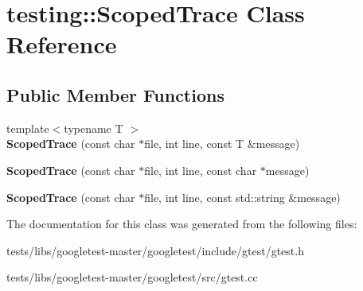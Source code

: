 \hypertarget{classtesting_1_1ScopedTrace}{}\section{testing\+:\+:Scoped\+Trace Class Reference}
\label{classtesting_1_1ScopedTrace}
\subsection*{Public Member Functions}
\begin{DoxyCompactItemize}
\item 
\mbox{\label{classtesting_1_1ScopedTrace_a2da90b95d682d518cca472934d53c59c}} 
{\footnotesize template$<$typename T $>$ }\\{\bfseries Scoped\+Trace} (const char $\ast$file, int line, const T \&message)
\item 
\mbox{\label{classtesting_1_1ScopedTrace_accd2a06cc941ffd7d6fe109adfdb4f19}} 
{\bfseries Scoped\+Trace} (const char $\ast$file, int line, const char $\ast$message)
\item 
\mbox{\label{classtesting_1_1ScopedTrace_a1f453a2aade0db6955a111a7cb329615}} 
{\bfseries Scoped\+Trace} (const char $\ast$file, int line, const std\+::string \&message)
\end{DoxyCompactItemize}


The documentation for this class was generated from the following files\+:\begin{DoxyCompactItemize}
\item 
tests/libs/googletest-\/master/googletest/include/gtest/gtest.\+h\item 
tests/libs/googletest-\/master/googletest/src/gtest.\+cc\end{DoxyCompactItemize}
